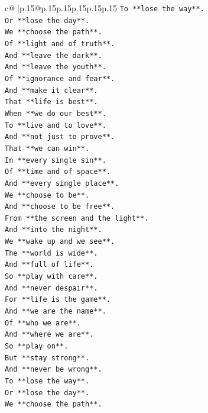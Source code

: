 \documentclass{article}
\begin{document}
{\begin{supertabular}{c@{$\;$}|p{.15\linewidth}@{}p{.15\linewidth}p{.15\linewidth}p{.15\linewidth}p{.15\linewidth}p{.15\linewidth}}
{{{\texttt{To **lose the way**.} \\
\texttt{Or **lose the day**.} \\
\texttt{We **choose the path**.} \\
\texttt{Of **light and of truth**.} \\
\texttt{And **leave the dark**.} \\
\texttt{And **leave the youth**.} \\
\texttt{Of **ignorance and fear**.} \\
\texttt{And **make it clear**.} \\
\texttt{That **life is best**.} \\
\texttt{When **we do our best**.} \\
\texttt{To **live and to love**.} \\
\texttt{And **not just to prove**.} \\
\texttt{That **we can win**.} \\
\texttt{In **every single sin**.} \\
\texttt{Of **time and of space**.} \\
\texttt{And **every single place**.} \\
\texttt{We **choose to be**.} \\
\texttt{And **choose to be free**.} \\
\texttt{From **the screen and the light**.} \\
\texttt{And **into the night**.} \\
\texttt{We **wake up and we see**.} \\
\texttt{The **world is wide**.} \\
\texttt{And **full of life**.} \\
\texttt{So **play with care**.} \\
\texttt{And **never despair**.} \\
\texttt{For **life is the game**.} \\
\texttt{And **we are the name**.} \\
\texttt{Of **who we are**.} \\
\texttt{And **where we are**.} \\
\texttt{So **play on**.} \\
\texttt{But **stay strong**.} \\
\texttt{And **never be wrong**.} \\
\texttt{To **lose the way**.} \\
\texttt{Or **lose the day**.} \\
\texttt{We **choose the path**.} \\
}}}
\end{supertabular}}
\end{document}
